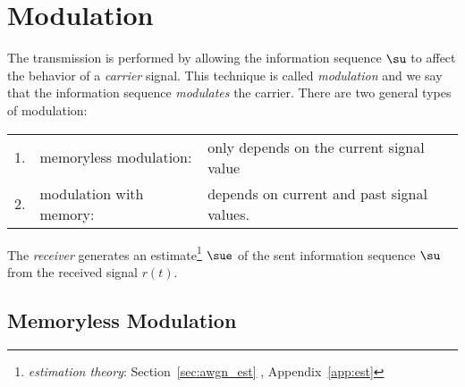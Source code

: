 
\chapter{Modulation}
\label{chp:mod_sin}
The transmission is performed by allowing the information sequence $\su$ to
affect the behavior of a {\em carrier} signal.
This technique is called {\em modulation} and we say that the 
information sequence {\em modulates} the carrier.
There are two general types of modulation:\\
\begin{tabular}{lll}
   1. & memoryless modulation:  & only depends on the current signal value   \\
   2. & modulation with memory: & depends on current and past signal values.
\end{tabular}

The {\em receiver} generates an estimate\footnote{
   {\em estimation theory}: 
   Section~\ref{sec:awgn_est} ,
   Appendix~\ref{app:est} 
   }
$\sue$ of the sent information sequence $\su$ from the received signal $r(t)$.


\section{Memoryless Modulation}
